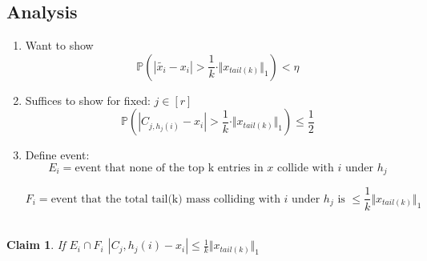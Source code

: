 \documentclass[11pt]{article}
\newtheorem{claim}[theorem]{Claim}
\begin{document}
\subsection*{Analysis}
\begin{enumerate}
\item Want to show\\
\[ \mathbb{P}(|\tilde{x_i}-x_i| > \frac{1}{k}\cdot\Vert x_{tail(k)}\Vert_1)< \eta\]

\item Suffices to show for fixed: $j \in [r]$ \\
\[ \mathbb{P}(|C_{j, h_j(i)}-x_i| > \frac{1}{k}\cdot\Vert x_{tail(k)}\Vert_1) \leq \frac{1}{2} \]

\item Define event:
\[ E_i = \text{event that none of the top k entries in } x \text{ collide with } i \text{ under } h_j\]

\[ F_i = \text{event that the total tail(k) mass colliding with } i \text{ under } h_j \text{ is } \leq \frac{1}{k} \Vert x_{tail(k)}\Vert_1\]\\
\end{enumerate}

\begin{claim} 
If $ E_i \cap F_i$ $|C_j, h_j(i) - x_i| \leq \frac{1}{k} \Vert x_{tail(k)}\Vert_1$
\end{claim}
\end{document}
